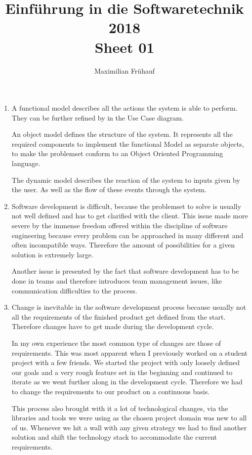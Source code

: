 \documentclass[a4paper, 10pt]{article}
\title{Einführung in die Softwaretechnik 2018 \\ Sheet 01}
\author{Maximilian Frühauf}
\begin{document}
\maketitle

\begin{enumerate}
	\item
	      A functional model describes all the actions the system is
	      able to perform. They can be further refined by in the Use Case diagram.

	      An object model defines the structure of the system.
	      It represents all the required components to implement the functional Model
	      as separate objects, to make the problemset conform to an Object Oriented Programming language.

	      The dynamic model describes the reaction of the system to inputs given by the
	      user. As well as the flow of these events through the system.
	\item
	      Software development is difficult, because the problemset to solve is
	      usually not well defined and has to get clarified with the client.
	      This issue made more severe by the immense freedom offered within the discipline of
	      software engineering because every problem can be approached in many different and often incompatible ways.
	      Therefore the amount of possibilities for a given solution is extremely large.

	      Another issue is presented by the fact that software development has to be
	      done in teams and therefore introduces team management issues, like communication
	      difficulties to the process.
	\item
	      Change is inevitable in the software development process because usually not all
	      the requirements of the finished product get defined from the start. Therefore changes have
	      to get made during the development cycle.

	      In my own experience the most common type of changes are those of requirements.
	      This was most apparent when I previously worked on a student project with a few friends.
	      We started the project with only loosely defined our goals and a very rough feature set
	      in the beginning and continued to iterate as we went further along in the development cycle.
	      Therefore we had to change the requirements to our product on a continuous basis.

	      This process also brought with it a lot of technological changes, via the libraries and tools we
	      were using as the chosen project domain was new to all of us. Whenever we hit a wall with any given strategy
	      we had to find another solution and shift the technology stack to accommodate the current requirements.


\end{enumerate}
\end{document}
